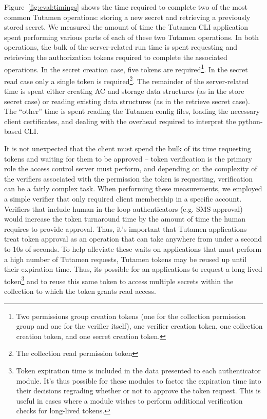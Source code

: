 Figure~\ref{fig:eval:timings} shows the time required to complete two
of the most common Tutamen operations: storing a new secret and
retrieving a previously stored secret. We measured the amount of time
the Tutamen CLI application spent performing various parts of each of
these two Tutamen operations. In both operations, the bulk of the
server-related run time is spent requesting and retrieving the
authorization tokens required to complete the associated
operations. In the secret creation case, five tokens are
required\footnote{Two permissions group creation tokens (one for the
  collection permission group and one for the verifier itself), one
  verifier creation token, one collection creation token, and one
  secret creation token.}. In the secret read case only a single token
is required\footnote{The collection read permission token}. The
remainder of the server-related time is spent either creating AC and
storage data structures (as in the store secret case) or reading
existing data structures (as in the retrieve secret case). The
``other'' time is spent reading the Tutamen config files, loading the
necessary client certificates, and dealing with the overhead required
to interpret the python-based CLI.

It is not unexpected that the client must spend the bulk of its time
requesting tokens and waiting for them to be approved -- token
verification is the primary role the access control server must
perform, and depending on the complexity of the verifiers associated
with the permission the token is requesting, verification can be a
fairly complex task. When performing these measurements, we employed a
simple verifier that only required client membership in a specific
account. Verifiers that include human-in-the-loop authenticators
(e.g. SMS approval) would increase the token turnaround time by the
amount of time the human requires to provide approval. Thus, it's
important that Tutamen applications treat token approval as an
operation that can take anywhere from under a second to 10s of
seconds. To help alleviate these waits on applications that must
perform a high number of Tutamen requests, Tutamen tokens may be
reused up until their expiration time. Thus, its possible for an
applications to request a long lived token\footnote{Token expiration
  time is included in the data presented to each authenticator
  module. It's thus possible for these modules to factor the
  expiration time into their decisions regrading whether or not to
  approve the token request. This is useful in cases where a module
  wishes to perform additional verification checks for long-lived
  tokens.} and to reuse this same token to access multiple secrets
within the collection to which the token grants read access.
 
